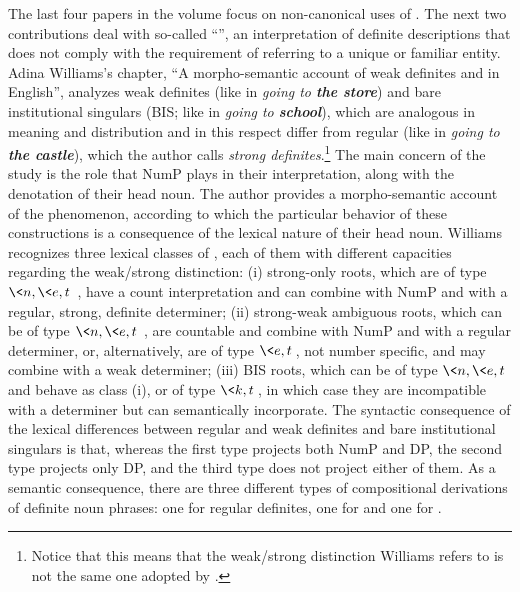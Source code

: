 \documentclass[output=paper]{langsci/langscibook}
\begin{document}
The last four papers in the volume focus on non-canonical uses of . The next two contributions deal with so-called “”, an interpretation of definite descriptions that does not comply with the requirement of referring to a unique or familiar entity. Adina Williams’s chapter, “A morpho-semantic account of weak definites and  in English”, analyzes  weak definites (like in \textit{going to \textbf{the store}}) and bare institutional singulars (BIS; like in \textit{going to \textbf{school}}), which are analogous in meaning and distribution and in this respect differ from regular  (like in \textit{going to \textbf{the castle}}), which the author calls \textit{strong definites}.\footnote{Notice that this means that the weak/strong distinction Williams refers to is not the same one adopted by \citet{Schwarz2009}.}  The main concern of the study is the role that NumP plays in their interpretation, along with the denotation of their head noun. The author provides a morpho-semantic account of the phenomenon, according to which the particular behavior of these constructions is a consequence of the lexical nature of their head noun. Williams recognizes three lexical classes of , each of them with different capacities regarding the weak/strong distinction: (i) strong-only roots, which are of type $ \<n, \<e, t\>\>$, have a count interpretation and can combine with NumP and with a regular, strong, definite determiner; (ii) strong-weak ambiguous roots, which can be of type $ \<n, \<e, t\>\>$, are countable and combine with NumP and with a regular determiner, or, alternatively, are of type $ \<e, t\>$, not number specific, and may combine with a weak determiner; (iii) BIS roots, which can be of type $ \<n, \<e, t\> \>$ and behave as class (i), or of type $ \<k, t\>$, in which case they are incompatible with a determiner but can semantically incorporate. The syntactic consequence of the lexical differences between regular and weak definites and bare institutional singulars is that, whereas the first type projects both NumP and DP, the second type projects only DP, and the third type does not project either of them. As a semantic consequence, there are three different types of compositional derivations of definite noun phrases: one for regular definites, one for  and one for .\largerpage[2]
\end{document}
